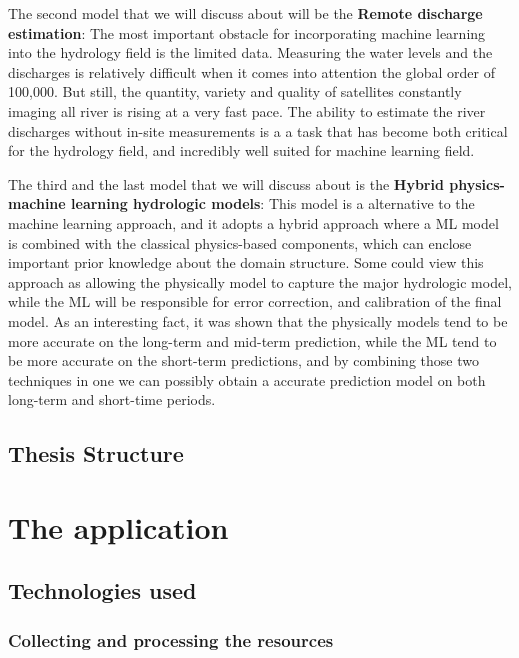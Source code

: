 \documentclass[12pt, a4paper]{report}
\begin{document}
The second model that we will discuss about will be the \textbf{Remote discharge estimation}: The most important obstacle for incorporating machine learning into the hydrology field is the limited data. Measuring the water levels and the discharges is relatively difficult when it comes into attention the global order of 100,000. But still, the quantity, variety and quality of satellites constantly imaging all river is rising at a very fast pace. The ability to estimate the river discharges without in-site measurements is a a task that has become both critical for the hydrology field, and incredibly well suited for machine learning field.
\par 

The third and the last model that we will discuss about is the \textbf{Hybrid physics-machine learning hydrologic models}: This model is a alternative to the machine learning approach, and it adopts a hybrid approach where a ML model is combined with the classical physics-based components, which can enclose important prior knowledge about the domain structure. Some could view this approach as allowing the physically model to capture the major hydrologic  model, while the ML will be responsible for error correction, and calibration of the final model. As an interesting fact, it was shown that the physically models tend to be more accurate on the long-term and mid-term prediction, while the ML tend to be more accurate on the short-term predictions, and by combining those two techniques in one we can possibly obtain a accurate prediction model on both long-term and short-time periods.



\section{Thesis Structure}



\newpage{}


\chapter{The application}

\section{Technologies used}

\subsection{Collecting and processing the resources}
\end{document}

